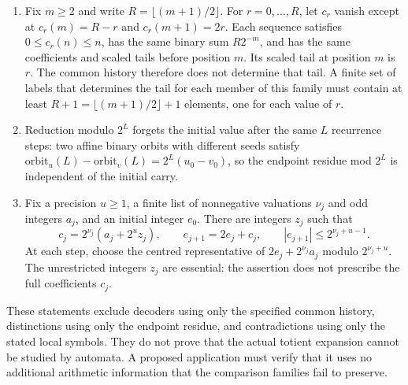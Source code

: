 \begin{prop}
\label{prop:b5}
\begin{enumerate}[label=(\roman*),leftmargin=*]
\item Fix $m\ge2$ and write $R=\lfloor(m+1)/2\rfloor$. For
  $r=0,\ldots,R$, let $c_r$ vanish except at
  $c_r(m)=R-r$ and $c_r(m+1)=2r$. Each sequence satisfies
  $0\le c_r(n)\le n$, has the same binary sum $R2^{-m}$, and has
  the same coefficients and scaled tails before position $m$.
  Its scaled tail at position $m$ is $r$. The common history therefore
  does not determine that tail. A finite set of labels that determines
  the tail for each member of this family must contain at least
  $R+1=\lfloor(m+1)/2\rfloor+1$ elements, one for each value of $r$.
\item Reduction modulo $2^L$ forgets the initial value after the same
$L$ recurrence steps: two
  affine binary orbits with different seeds satisfy
  $\mathrm{orbit}_u(L) - \mathrm{orbit}_v(L) = 2^{L}(u_0 - v_0)$, so the
  endpoint residue mod $2^{L}$ is independent of the initial carry.
\item Fix a precision $u\ge1$, a finite list of nonnegative valuations
  $\nu_j$ and odd integers $a_j$, and an initial integer $e_0$.
  There are integers $z_j$ such that
  \[
   c_j=2^{\nu_j}(a_j+2^u z_j),\qquad
   e_{j+1}=2e_j+c_j,\qquad |e_{j+1}|\le2^{\nu_j+u-1}.
  \]
  At each step, choose the centred representative of
  $2e_j+2^{\nu_j}a_j$ modulo $2^{\nu_j+u}$.
  The unrestricted integers $z_j$ are essential: the assertion does not
  prescribe the full coefficients $c_j$.
\end{enumerate}
These statements exclude decoders using only the specified common
history, distinctions using only the endpoint residue, and contradictions
using only the stated local symbols. They do not prove that the actual
totient expansion cannot be studied by automata. A proposed application
must verify that it uses no additional arithmetic information that the
comparison families fail to preserve.
\end{prop}

